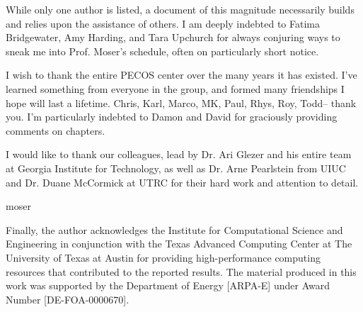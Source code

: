 %

While only one author is listed, a document of this magnitude
necessarily builds and relies upon the assistance of others. 
%
%
I am deeply indebted to Fatima Bridgewater, Amy Harding, and Tara
Upchurch for always conjuring ways to sneak me into Prof. Moser's
schedule, often on particularly short notice. 

%
%
I wish to thank the entire PECOS center over the many years it has
existed. I've learned something from everyone in the group, and formed
many friendships I hope will last a lifetime. Chris, Karl, Marco, MK,
Paul, Rhys, Roy, Todd-- thank you. I'm particularly indebted to Damon and
David for graciously providing comments on chapters.   


%
%
I would like to thank our colleagues, lead by Dr\@. Ari Glezer and his 
entire team at Georgia Institute for Technology, as well as Dr\@. Arne
Pearlstein from UIUC and Dr\@. Duane McCormick at UTRC for their hard
work and attention to detail. 

%
%
moser

%
%
%


Finally, the author acknowledges the Institute for Computational Science
and Engineering in conjunction with the Texas Advanced Computing Center
at The University of Texas at Austin for providing high-performance
computing resources that contributed to the reported results.
The material produced in this work was supported by the Department of
Energy [ARPA-E] under Award Number [DE-FOA-0000670].


